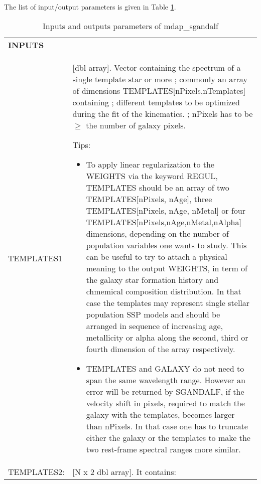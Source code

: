 \documentclass[11pt]{book}
\begin{document}
The list of input/output parameters is given in Table
\ref{dap_tab:mdap_sgandalf}.


\begin{center}
\begin{longtable}{p{2.7cm}| p{11.1cm}}
\caption{Inputs and outputs parameters of mdap\_sgandalf} \label{dap_tab:mdap_sgandalf} \\
\hline
\endfirsthead
\hline
\endhead
\hline
\endlastfoot
\hline
{\bf  INPUTS} & \\
TEMPLATES1 & [dbl array].  Vector containing the spectrum of a single template star or
        more ; commonly an array of dimensions
        TEMPLATES[nPixels,nTemplates] containing ; different templates
        to be optimized during the fit of the kinematics.  ; nPixels
        has to be $\geq$ the number of galaxy pixels.  

         Tips:
           \begin{itemize}

   \item To apply linear regularization to the WEIGHTS via the
     keyword REGUL, TEMPLATES should be an array of two
     TEMPLATES[nPixels, nAge], three TEMPLATES[nPixels, nAge, nMetal]
     or four TEMPLATES[nPixels,nAge,nMetal,nAlpha] dimensions,
     depending on the number of population variables one wants to
     study.  This can be useful to try to attach a physical meaning
     to the output WEIGHTS, in term of the galaxy star formation
     history and chmemical composition distribution.  In that case
     the templates may represent single stellar population SSP
     models and should be arranged in sequence of increasing age,
     metallicity or alpha along the second, third or fourth
     dimension of the array respectively.

   \item TEMPLATES and GALAXY do not need to span the same
     wavelength range. However an error will be returned by
     SGANDALF, if the velocity shift in pixels, required to match
     the galaxy with the templates, becomes larger than nPixels. In
     that case one has to truncate either the galaxy or the
     templates to make the two rest-frame spectral ranges more
     similar.

      \end{itemize} \\
%
TEMPLATES2: &[N x 2  dbl array]. It contains:


\end{longtable}
\end{center}
\end{document}
